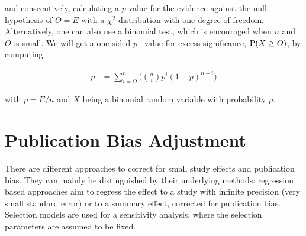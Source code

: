 \documentclass[11pt,a4paper,twoside]{book}\usepackage[]{graphicx}\usepackage[]{color}
\begin{document}
and consecutively, calculating a $p$\hspace{0.4mm}-value for the evidence against the null-hypothesis of $O = E$ with a $\chi^2$ distribution with one degree of freedom. Alternatively, one can also use a binomial test, which is encouraged when $n$ and $O$ is small. We will get a one sided $p$\hspace{0.4mm}~-value for excess significance, $\P(X \geq O)$, by computing

\begin{align}
p &= \sum_{i = O}^n\Big({n \choose i} p^i (1-p)^{n - i}\Big) \nonumber
\end{align}

with $p = E/n$ and $X$ being a binomial random variable with probability $p$. 











\section{Publication Bias Adjustment}
There are different approaches to correct for small study effects and publication bias. They can mainly be distinguished by their underlying methods: regression based approaches aim to regress the effect to a study with infinite precision (\ie very small standard error) or to a summary effect, corrected for publication bias. Selection models are used for a sensitivity analysis, where the selection parameters are assumed to be fixed. 
\end{document}

